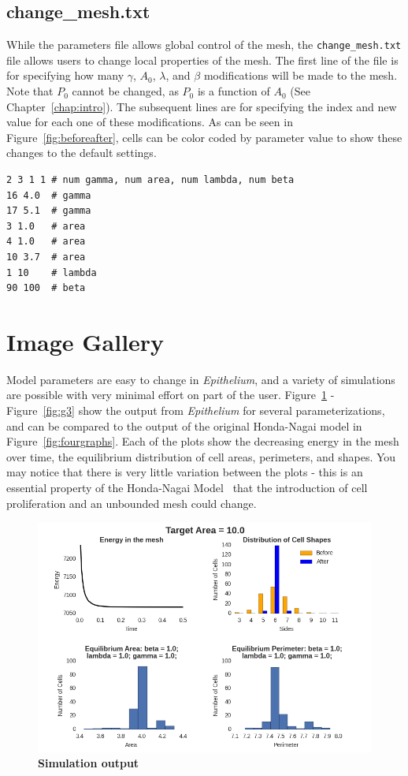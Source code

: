 \subsection{change\_mesh.txt}
While the parameters file allows global control of the mesh, the \texttt{change\_mesh.txt} file allows users to change local properties of the mesh. The first line of the file is for specifying how many $\gamma$, $A_0$, $\lambda$, and $\beta$ modifications will be made to the mesh. Note that $P_0$ cannot be changed, as $P_0$ is a function of $A_0$ (See Chapter~\ref{chap:intro}). The subsequent lines are for specifying the index and new value for each one of these modifications. As can be seen in Figure~\ref{fig:beforeafter}, cells can be color coded by parameter value to show these changes to the default settings.
\begin{lstlisting}
2 3 1 1 # num gamma, num area, num lambda, num beta
16 4.0  # gamma
17 5.1  # gamma
3 1.0   # area
4 1.0   # area
10 3.7  # area
1 10    # lambda
90 100  # beta
\end{lstlisting}

\section{Image Gallery}
Model parameters are easy to change in \emph{Epithelium}, and a variety of simulations are possible with very minimal effort on part of the user. Figure~\ref{fig:g1} - Figure~\ref{fig:g3} show the output from \emph{Epithelium} for several parameterizations, and can be compared to the output of the original Honda-Nagai model in Figure~\ref{fig:fourgraphs}. Each of the plots show the decreasing energy in the mesh over time, the equilibrium distribution of cell areas, perimeters, and shapes. You may notice that there is very little variation between the plots - this is an essential property of the Honda-Nagai Model~\cite{HondaNagai} that the introduction of cell proliferation and an unbounded mesh could change.  

\begin{figure}
\centering
\includegraphics[height=0.4\textheight]{../diagrams/graphs4.png}
\caption[\textbf{Simulation output.}]{\textbf{Simulation output}}
\label{fig:g1}
\end{figure}


